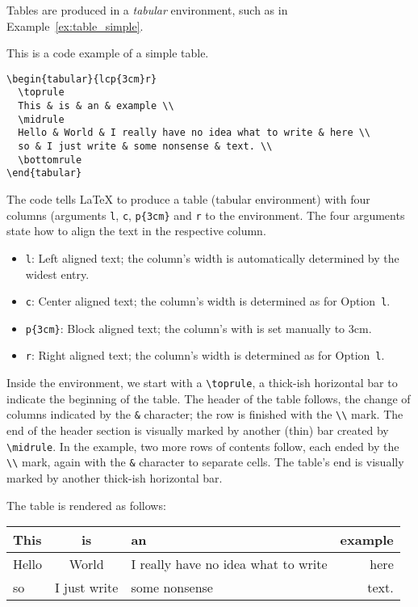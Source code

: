 Tables are produced in a \emph{tabular} environment, such as in
Example~\ref{ex:table_simple}.
\begin{example}
\label{ex:table_simple}
This is a code example of a simple table.
\begin{verbatim}
\begin{tabular}{lcp{3cm}r}
  \toprule
  This & is & an & example \\
  \midrule
  Hello & World & I really have no idea what to write & here \\
  so & I just write & some nonsense & text. \\
  \bottomrule
\end{tabular}
\end{verbatim}
The code tells \LaTeX{} to produce a table (tabular environment) with four
columns (arguments \verb+l+, \verb+c+, \verb+p{3cm}+ and \verb+r+ to the
environment.
The four arguments state how to align the text in the respective column.
\begin{itemize}
	\item \verb+l+: Left aligned text; the column's width is automatically
	determined by the widest entry.
	\item \verb+c+: Center aligned text; the column's width is determined
	as for Option~\verb+l+.
	\item \verb+p{3cm}+: Block aligned text; the column's with is set
	manually to 3cm.
	\item \verb+r+: Right aligned text; the column's width is determined as
	for Option~\verb+l+.
\end{itemize}
Inside the environment, we start with a \verb+\toprule+, a thick-ish horizontal
bar to indicate the beginning of the table.
The header of the table follows, the change of columns indicated by the
\verb+&+ character; the row is finished with the \verb+\\+ mark.
The end of the header section is visually marked by another (thin) bar created
by \verb+\midrule+.
In the example, two more rows of contents follow, each ended by the \verb+\\+
mark, again with the \verb+&+ character to separate cells.
The table's end is visually marked by another thick-ish horizontal bar.

The table is rendered as follows:

\begin{tabular}{lcp{3cm}r}
	\toprule
	This & is & an & example \\
	\midrule
	Hello & World & I really have no idea what to write & here \\
	so & I just write & some nonsense & text. \\
	\bottomrule
\end{tabular}
\end{example}

